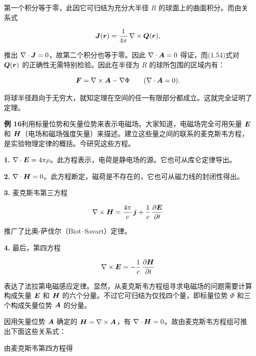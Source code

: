 第一个积分等于零，此因它可归结为充分大半径 $R$ 的球面上的曲面积分。而由关系式

\begin{equation*}
\bm{J}(\bm{r}) = \frac{1}{4\pi}\, \nabla \times \bm{Q}(\bm{r}),
\end{equation*}

推出 $\nabla \cdot \bm{J} = 0$，故第二个积分也等于零。因此 $\nabla \cdot \bm{A} = 0$ 得证，而(1.54)式对 $\bm{Q}(\bm{r})$ 的正确性无需特别检验。因此在半径为 $R$ 的球所包围的区域内有：

\begin{equation*}
\bm{F} = \nabla \times \bm{A} - \nabla\Phi \qquad (\nabla \cdot \bm{A} = 0).
\end{equation*}

将球半径趋向于无穷大，就知定理在空间的任一有限部分都成立。这就完全证明了定理。

\textbf{例 16}\quad 利用标量位势和矢量位势来表示电磁场。大家知道，电磁场完全可用矢量 $\bm{E}$ 和 $\bm{H}$（电场和磁场强度矢量）来描述。建立这些量之间的联系的麦克斯韦方程，是实验物理定律的概括。今研究这些方程。

\textbf{1.} $\nabla \cdot \bm{E} = 4\pi\rho$。此方程表示，电荷是静电场的源。它也可从库仑定律导出。

\textbf{2.} $\nabla \cdot \bm{H} = 0$。此方程断定，磁荷是不存在的，它也可从磁力线的封闭性得出。

\textbf{3.} 麦克斯韦第三方程

\begin{equation*}
\nabla \times \bm{H} = \frac{4\pi}{c}\, \bm{j} + \frac{1}{c}\, \frac{\partial\bm{E}}{\partial t}
\end{equation*}

推广了比奥-萨伐尔（Biot--Savart）定律。

\textbf{4.} 最后，第四方程

\begin{equation*}
\nabla \times \bm{E} = -\frac{1}{c}\, \frac{\partial\bm{H}}{\partial t}
\end{equation*}

表达了法拉第电磁感应定律。显然，从麦克斯韦方程组寻求电磁场的问题需要计算构成矢量 $\bm{E}$ 和 $\bm{H}$ 的六个分量。不过它可归结为仅找四个量，即标量位势 $\Phi$ 和三个构成矢量位势 $\bm{A}$ 的分量。

因用矢量位势 $\bm{A}$ 确定的 $\bm{H} = \nabla \times \bm{A}$，有 $\nabla \cdot \bm{H} = 0$。故由麦克斯韦方程组可推出下面这些关系式：

由麦克斯韦第四方程得

